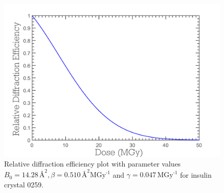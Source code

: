 \begin{figure}
  \centering
    \includegraphics[width=1\textwidth]{figures/zde/RDEPlot_zde.pdf}
    \caption[Relative diffraction efficiency as a function of the dose.]{Relative diffraction efficiency plot with parameter values $B_0 = 14.28\,\text{\AA}^2, \beta = 0.510\,\text{\AA}^2 \text{MGy}^{\text{-1}}$ and $\gamma = 0.047\,\text{MGy}^{\text{-1}}$ for insulin crystal 0259.}
    \label{fig:Relative diffraction efficiency plot - ZDE}
\end{figure}

